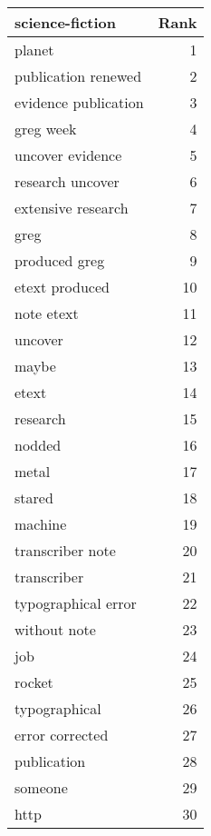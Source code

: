 \begin{table}
\label{tab:science-fiction_terms}
\begin{tabular}{lr}
\toprule
science-fiction & Rank \\
\midrule
planet & 1 \\
publication renewed & 2 \\
evidence publication & 3 \\
greg week & 4 \\
uncover evidence & 5 \\
research uncover & 6 \\
extensive research & 7 \\
greg & 8 \\
produced greg & 9 \\
etext produced & 10 \\
note etext & 11 \\
uncover & 12 \\
maybe & 13 \\
etext & 14 \\
research & 15 \\
nodded & 16 \\
metal & 17 \\
stared & 18 \\
machine & 19 \\
transcriber note & 20 \\
transcriber & 21 \\
typographical error & 22 \\
without note & 23 \\
job & 24 \\
rocket & 25 \\
typographical & 26 \\
error corrected & 27 \\
publication & 28 \\
someone & 29 \\
http & 30 \\
\bottomrule
\end{tabular}
\end{table}
